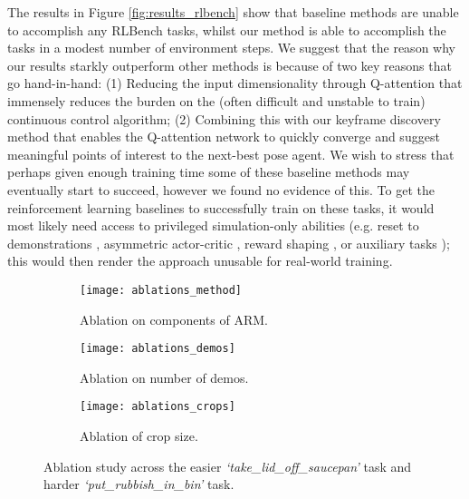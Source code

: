 \documentclass[letterpaper, 10 pt, journal, twoside]{IEEEtran}
\begin{document}
The results in Figure \ref{fig:results_rlbench} show that baseline methods are unable to accomplish any RLBench tasks, whilst our method is able to accomplish the tasks in a modest number of environment steps. We suggest that the reason why our results starkly outperform other methods is because of two key reasons that go hand-in-hand: (1) Reducing the input dimensionality through Q-attention that immensely reduces the burden on the (often difficult and unstable to train) continuous control algorithm; (2) Combining this with our keyframe discovery method that enables the Q-attention network to quickly converge and suggest meaningful points of interest to the next-best pose agent. We wish to stress that perhaps given enough training time some of these baseline methods may eventually start to succeed, however we found no evidence of this. To get the reinforcement learning baselines to successfully train on these tasks, it would most likely need access to privileged simulation-only abilities (e.g. reset to demonstrations \cite{nair2018overcoming}, asymmetric actor-critic \cite{pinto2017asymmetric}, reward shaping \cite{rajeswaran2017learning}, or auxiliary tasks \cite{james2017transferring}); this would then render the approach unusable for real-world training. 


\begin{figure*}
     \centering
     \begin{subfigure}[b]{0.32\textwidth}
         \centering
         \texttt{[image: ablations\_method]}
         \caption{Ablation on components of ARM.}
         \label{fig:results_components_ablation}
     \end{subfigure}
     \hfill
     \begin{subfigure}[b]{0.32\textwidth}
         \centering
         \texttt{[image: ablations\_demos]}
         \caption{Ablation on number of demos.}
         \label{fig:results_demo_size}
     \end{subfigure}
     \hfill
     \begin{subfigure}[b]{0.32\textwidth}
         \centering
         \texttt{[image: ablations\_crops]}
         \caption{Ablation of crop size.}
         \label{fig:results_crops}
     \end{subfigure}
        \caption{Ablation study across the easier \textit{`take\_lid\_off\_saucepan'} task and harder \textit{`put\_rubbish\_in\_bin'} task.}
        \label{fig:ablation}
\vspace{-10pt}
\end{figure*}
\end{document}
